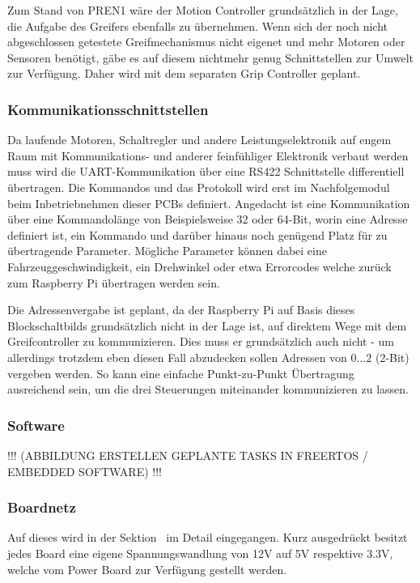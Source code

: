 \documentclass[main.tex]{subfiles} %
\begin{document}
Zum Stand von PREN1 wäre der Motion Controller grundsätzlich in der Lage, die
Aufgabe des Greifers ebenfalls zu übernehmen. Wenn sich der noch nicht
abgeschlossen getestete Greifmechanismus nicht eigenet und mehr Motoren oder
Sensoren benötigt, gäbe es auf diesem nichtmehr genug Schnittstellen zur Umwelt
zur Verfügung. Daher wird mit dem separaten Grip Controller geplant.

\subsubsection*{Kommunikationsschnittstellen}
Da laufende Motoren, Schaltregler und andere Leistungselektronik auf engem Raum mit
Kommunikations- und anderer feinfühliger Elektronik verbaut werden muss wird die UART-Kommunikation
über eine RS422 Schnittstelle differentiell übertragen. Die Kommandos und das Protokoll wird erst
im Nachfolgemodul beim Inbetriebnehmen dieser PCBs definiert. Angedacht ist eine Kommunikation
über eine Kommandolänge von Beispielsweise 32 oder 64-Bit, worin eine Adresse definiert ist, ein Kommando und
darüber hinaus noch genügend Platz für zu übertragende Parameter. Mögliche Parameter können dabei
eine Fahrzeuggeschwindigkeit, ein Drehwinkel oder etwa Errorcodes welche zurück zum Raspberry Pi übertragen werden sein.

Die Adressenvergabe ist geplant, da der Raspberry Pi auf Basis dieses
Blockschaltbilds grundsätzlich nicht in der Lage ist, auf direktem Wege mit dem
Greifcontroller zu kommunizieren. Dies muss er grundsätzlich auch nicht - um
allerdings trotzdem eben diesen Fall abzudecken sollen Adressen von $0 \dots 2$
(2-Bit) vergeben werden. So kann eine einfache Punkt-zu-Punkt Übertragung
ausreichend sein, um die drei Steuerungen miteinander kommunizieren zu lassen.

\subsubsection*{Software}
!!! (ABBILDUNG ERSTELLEN GEPLANTE TASKS IN FREERTOS / EMBEDDED SOFTWARE) !!!

\subsubsection*{Boardnetz}
Auf dieses wird in der Sektion~\label{sec:Boardnetz} im Detail eingegangen. Kurz ausgedrückt
besitzt jedes Board eine eigene Spannungswandlung von 12V auf 5V respektive 3.3V, welche vom
Power Board zur Verfügung gestellt werden.
\end{document}
